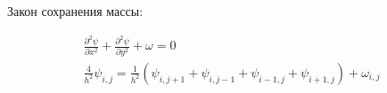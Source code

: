 \documentclass[a4paper, 12pt]{article}
\numberwithin{equation}{section}
\newcommand{\dder}[2]{\frac{\partial^2 {#1}}{\partial {#2}^2}}
\begin{document}
  Закон сохранения массы:

  \begin{gather*}
    \dder{\psi}{x} + \dder{\psi}{y} + \omega = 0
    \\
    \frac{4}{h^2}\psi_{i,j} = \frac{1}{h^2} \left(
      \psi_{i,j+1} + \psi_{i,j-1} + \psi_{i-1,j} + \psi_{i+1,j}
    \right) + \omega_{i,j}
  \end{gather*}
\end{document}
